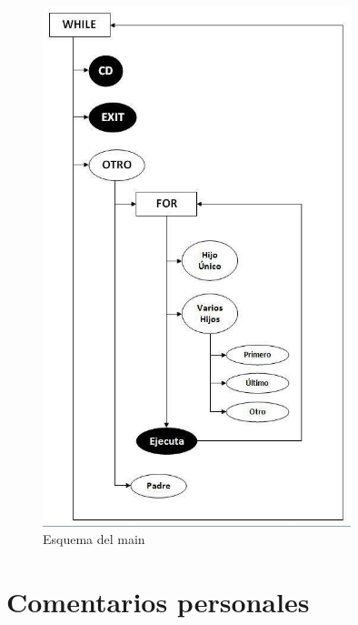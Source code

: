 \begin{figure}[htb]
\begin{center}
 \centering
 \includegraphics[width=0.8\textwidth]{./esquema}
 \caption{Esquema del main}
 \label{fig:Esquema del main}
\end{center}
\end{figure}

\chapter{Comentarios personales}
